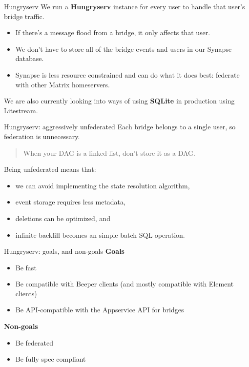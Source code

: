 \documentclass{beeper}
\begin{document}
\begin{frame}{Hungryserv}
    We run a \textbf{Hungryserv} instance for every user to handle that user's
    bridge traffic.
    \pause

    \begin{itemize}[<+->]
        \item If there's a message flood from a bridge, it only affects that
            user.
        \item We don't have to store all of the bridge events and users in our
            Synapse database.
        \item Synapse is less resource constrained and can do what it does best:
            federate with other Matrix homeservers.
    \end{itemize}
    \pause[\thebeamerpauses]

    We are also currently looking into ways of using \textbf{SQLite} in
    production using Litestream.
\end{frame}

\begin{frame}{Hungryserv: aggressively unfederated}
    Each bridge belongs to a single user, so federation is unnecessary. \\
    \pause

    \begin{quote}
        When your DAG is a linked-list, don't store it as a DAG.
    \end{quote}
    \pause

    Being unfederated means that:
    \begin{itemize}
        \item we can avoid implementing the state resolution algorithm,
        \item event storage requires less metadata,
        \item deletions can be optimized, and
        \item infinite backfill becomes an simple batch SQL operation.
    \end{itemize}
\end{frame}

\begin{frame}{Hungryserv: goals, and non-goals}
    \textbf{Goals}
    \begin{itemize}
        \item Be fast
        \item Be compatible with Beeper clients (and mostly compatible with
            Element clients)
        \item Be API-compatible with the Appservice API for bridges
    \end{itemize}
    \pause

    \textbf{Non-goals}
    \begin{itemize}
        \item Be federated
        \item Be fully spec compliant
    \end{itemize}
\end{frame}
\end{document}
